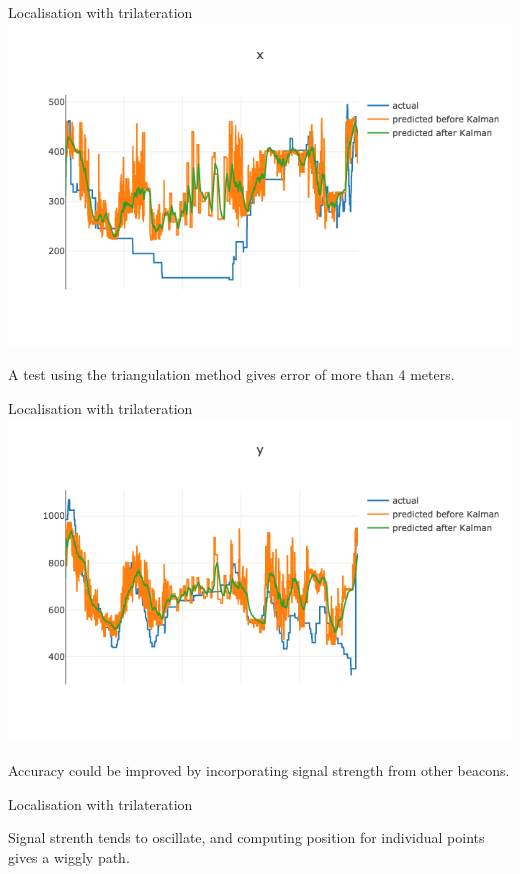 \documentclass[landscape]{infslides}
\begin{document}
\begin{slide}{Localisation with trilateration}
    \centering
\includegraphics[width=0.6\linewidth]{images/trilateration_x.png}

A test using the triangulation method gives error of more than 4 meters.
\end{slide}

\begin{slide}{Localisation with trilateration}
    \centering
\includegraphics[width=0.6\linewidth]{images/trilateration_y.png}

Accuracy could be improved by incorporating signal strength from other beacons.
\end{slide}

\begin{slide}{Localisation with trilateration}

Signal strenth tends to oscillate, and computing position for individual points gives a wiggly path.
\end{slide}
\end{document}
